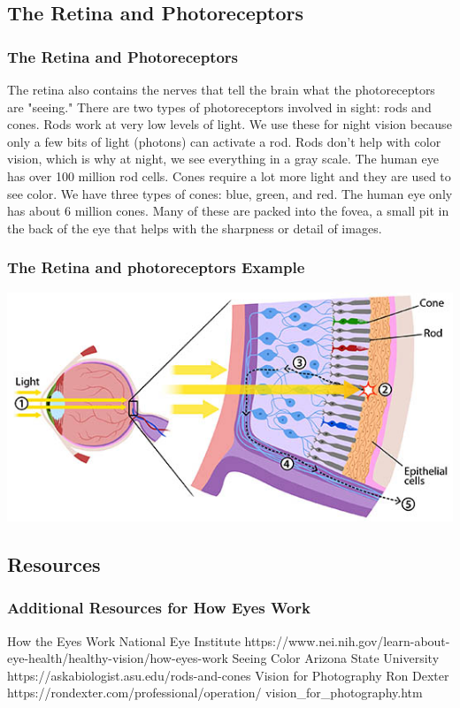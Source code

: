 \documentclass{beamer}
\begin{document}
\subsection{The Retina and Photoreceptors}		

\begin{frame}
	\frametitle{The Retina and Photoreceptors}
	\begin{outline}
		\1 The retina also contains the nerves that tell the brain what the photoreceptors are "seeing."
		\1 There are two types of photoreceptors involved in sight: rods and cones.
		\1 Rods work at very low levels of light. 
		\2 We use these for night vision because only a few bits of light (photons) can activate a rod. 
		\2 Rods don't help with color vision, which is why at night, we see everything in a gray scale. 
		\2 The human eye has over 100 million rod cells.
		\1 Cones require a lot more light and they are used to see color. 
		\2 We have three types of cones: blue, green, and red. 
		\2 The human eye only has about 6 million cones.
		\2 Many of these are packed into the fovea, a small pit in the back of the eye that helps with the sharpness or detail of images.
	\end{outline}
\end{frame}

\begin{frame}
	\frametitle{The Retina and photoreceptors Example}
	\begin{center}
		\includegraphics[width=1.0\textwidth]{images/Light-Through-The-Eye.jpg}
	\end{center}
\end{frame}

\subsection{Resources}		
\begin{frame}
	\frametitle{Additional Resources for How Eyes Work}
	\begin{outline}
		\1 How the Eyes Work
		\2 National Eye Institute
		\2 https://www.nei.nih.gov/learn-about-eye-health/healthy-vision/how-eyes-work
		\1 Seeing Color 
		\2 Arizona State University
		\2 https://askabiologist.asu.edu/rods-and-cones
		\1 Vision for Photography
		\2 Ron Dexter
		\2 https://rondexter.com/professional/operation/ vision\_for\_photography.htm
	\end{outline}
\end{frame}
\end{document}
